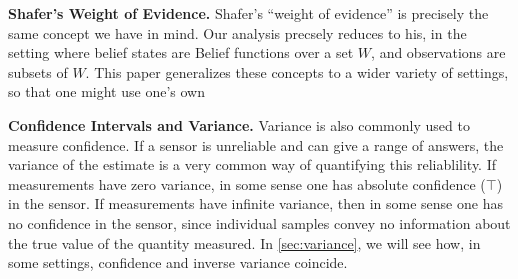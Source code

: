 \documentclass{article}
\begin{document}
\textbf{Shafer's Weight of Evidence.}
Shafer's ``weight of evidence'' is precisely the same concept we have in mind. 
Our analysis precsely reduces to his, in the setting where belief states are Belief functions over a set $W$, and observations are subsets of $W$. 
This paper generalizes these concepts to a wider variety of settings, so that one might use one's own 


\textbf{Confidence Intervals and Variance.}
Variance is also commonly used to measure confidence. 
If a sensor is unreliable and can give a range of answers, the variance of the estimate is a very common way of quantifying this reliablility.
If measurements have zero variance, in some sense one has absolute confidence ($\top$) in the sensor. If measurements have infinite variance, then in some sense one has no confidence in the sensor, since individual samples convey no information about the true value of the quantity measured.
In \cref{sec:variance}, we will see how, in some settings, confidence and inverse variance coincide.


\end{document}

